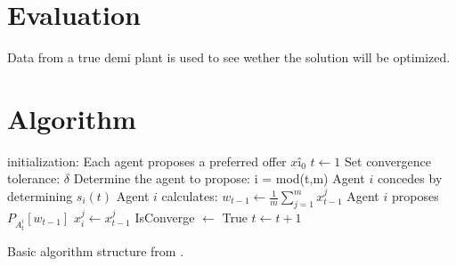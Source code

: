 \section{Evaluation}
Data from a true demi plant is used to see wether the solution will be optimized.

\clearpage
\section{Algorithm}

\begin{algorithm}
	initialization: Each agent proposes a preferred offer $xî_0$\;
	$t\leftarrow1$\;
	Set convergence tolerance: $\delta$\;
	{
		Determine the agent to propose: i = mod(t,m)\;
		{
			{
				Agent $i$ concedes by determining $s_i(t)$\;
				Agent $i$ calculates: $w_{t-1}\leftarrow \frac{1}{m}\sum_{j=1}^{m}x^j_{t-1}$\;
				Agent $i$ proposes $P_{A^i_t}[w_{t-1}]$\;
			}{
				$x^j_i \leftarrow x^j_{t-1}$\;
			}
		}
		{
			IsConverge $\leftarrow $ True\;
		}{
			$t \leftarrow t+1$\;
		}
	}
\caption{Basic algorithm structure from \citet{zheng2015automated}.}
\end{algorithm}

\todos
